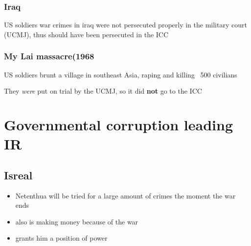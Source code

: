 \documentclass{article}
\begin{document}
\subsubsection{Iraq}

US soldiers war crimes in iraq were not persecuted properly in the military court (UCMJ), thus should have been persecuted in the ICC

\subsubsection{My Lai massacre(1968}
US soldiers brunt a village in southeast Asia, raping and killing ~500 civilians

They \textit{were} put on trial by the UCMJ, so it did \textbf{not} go to the ICC

\section{Governmental corruption leading IR}
\subsection{Isreal}
\begin{itemize}

    \item Netenthua will be tried for a large amount of crimes the moment the war ends
    \item also is making money because of the war
    \item grants him a position of power

\end{itemize}
\end{document}
